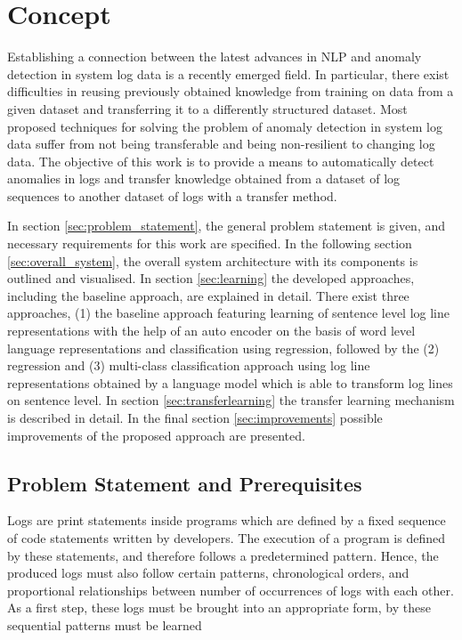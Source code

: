 \chapter{Concept \label{cha:concept}}
Establishing a connection between the latest advances in NLP and anomaly detection in system log data is a recently emerged field. In particular, there exist difficulties in reusing previously obtained knowledge from training on data from a given dataset and transferring it to a differently structured dataset. Most proposed techniques for solving the problem of anomaly detection in system log data suffer from not being transferable and being non-resilient to changing log data. The objective of this work is to provide a means to automatically detect anomalies in logs and transfer knowledge obtained from a dataset of log sequences to another dataset of logs with a transfer method.

In section \ref{sec:problem_statement}, the general problem statement is given, and necessary requirements for this work are specified. 
In the following section \ref{sec:overall_system}, the overall system architecture with its components is outlined and visualised.
In section \ref{sec:learning} the developed approaches, including the baseline approach, are explained in detail. There exist three approaches, (1) the baseline approach featuring learning of sentence level log line representations with the help of an auto encoder on the basis of word level language representations and classification using regression, followed by the (2) regression and (3) multi-class classification approach using log line representations obtained by a language model which is able to transform log lines on sentence level.
In section \ref{sec:transferlearning} the transfer learning mechanism is described in detail.
In the final section \ref{sec:improvements} possible improvements of the proposed approach are presented.


\section{Problem Statement and Prerequisites \label{sec:problem_statement}}
Logs are print statements inside programs which are defined by a fixed sequence of code statements written by developers. The execution of a program is defined by these statements, and therefore follows a predetermined pattern. Hence, the produced logs must also follow certain patterns, chronological orders, and proportional relationships between number of occurrences of logs with each other. As a first step, these logs must be brought into an appropriate form, by these sequential patterns must be learned

